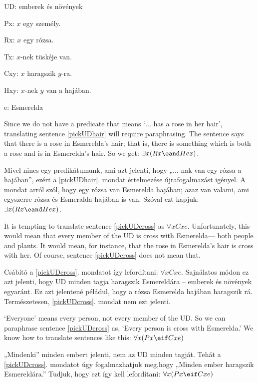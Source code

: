 \begin{ekey}
\item[UD:] emberek és növények 
\item[Px:] $x$ egy személy.
\item[Rx:] $x$ egy rózsa.
\item[Tx:] $x$-nek tüskéje van.
\item[Cxy:] $x$ haragszik $y$-ra. 
\item[Hxy:] $x$-nek $y$ van a hajában.
\item[e:] Esmerelda 
\end{ekey}

Since we do not have a predicate that means `$\ldots$ has a rose in her hair', translating sentence \ref{pickUDhair} will require paraphrasing. The sentence says that there is a rose in Esmerelda's hair; that is, there is something which is both a rose and is in Esmerelda's hair. So we get: $\exists x(Rx \eand Hex)$.

Mivel nincs egy predikátumunk, ami azt jelenti, hogy „$\ldots$-nak van egy rózsa a hajában”, ezért a \ref{pickUDhair}. mondat értelmezése újrafogalmazást igényel. A mondat arról szól, hogy egy rózsa van Esmerelda hajában; azaz van valami, ami egyszerre rózsa és Esmeralda hajában is van. Szóval ezt kapjuk: $\exists x(Rx \eand Hex)$.



It is tempting to translate sentence \ref{pickUDcross} as $\forall x Cxe$. Unfortunately, this would mean that every member of the UD is cross with Esmerelda--- both people and plants. It would mean, for instance, that the rose in Esmerelda's hair is cross with her. Of course, sentence \ref{pickUDcross} does not mean that.

Csábító a \ref{pickUDcross}. mondatot így lefordítani: $\forall x Cxe$. Sajnálatos módon ez azt jelenti, hogy UD minden tagja haragszik Esmereldára -- emberek és növények egyaránt. Ez azt jelentené péládul, hogy a rózsa Esmerelda hajában haragszik rá. Természetesen, \ref{pickUDcross}. mondat nem ezt jelenti.

`Everyone' means every person, not every member of the UD. So we can paraphrase sentence \ref{pickUDcross} as, `Every person is cross with Esmerelda.' We know how to translate sentences like this: $\forall x(Px \eif Cxe)$

„Mindenki” minden embert jelenti, nem az UD minden tagját. Tehát a \ref{pickUDcross}. mondatot úgy fogalmazhatjuk meg,hogy  „Minden ember haragszik Esmereldára.” Tudjuk, hogy ezt így kell lefordítani: $\forall x(Px \eif Cxe)$

